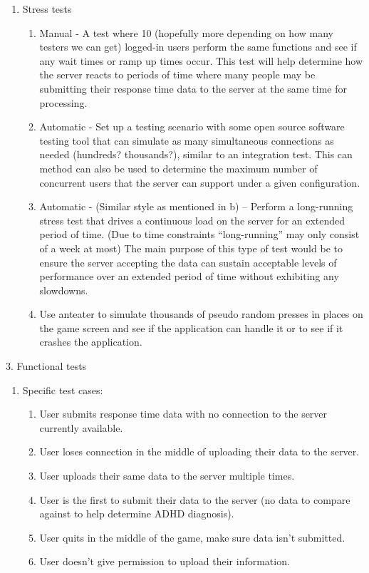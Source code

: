 \documentclass[a4wide]{article}
\begin{document}
\begin{enumerate}
\begin{enumerate}
\item	Stress tests
\begin{enumerate}
\item	Manual - A test where 10 (hopefully more depending on how many testers we can get) logged-in users perform the same functions and see if any wait times or ramp up times occur. This test will help determine how the server reacts to periods of time where many people may be submitting their response time data to the server at the same time for processing.
\item	Automatic - Set up a testing scenario with some open source software testing tool that can simulate as many simultaneous connections as needed (hundreds? thousands?), similar to an integration test. This can method can also be used to determine the maximum number of concurrent users that the server can support under a given configuration.
\item	Automatic - (Similar style as mentioned in b) – Perform a long-running stress test that drives a continuous load on the server for an extended period of time.  (Due to time constraints “long-running” may only consist of a week at most) The main purpose of this type of test would be to ensure the server accepting the data can sustain acceptable levels of performance over an extended period of time without exhibiting any slowdowns.
\item	Use anteater to simulate thousands of pseudo random presses in places on the game screen and see if the application can handle it or to see if it crashes the application.
\end{enumerate}
\end{enumerate}
3.	Functional tests
\begin{enumerate}
\item	Specific test cases:
\begin{enumerate}
\item	User submits response time data with no connection to the server currently available.
\item	User loses connection in the middle of uploading their data to the server.
\item	User uploads their same data to the server multiple times.
\item	User is the first to submit their data to the server (no data to compare against to help determine ADHD diagnosis).
\item	User quits in the middle of the game, make sure data isn’t submitted.
\item	User doesn't give permission to upload their information.

\end{enumerate}
\end{enumerate}
\end{enumerate}
\end{document}
